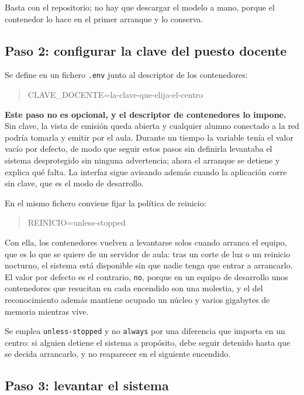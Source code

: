 Basta con el repositorio; no hay que descargar el modelo a mano, porque el contenedor lo
hace en el primer arranque y lo conserva.

\subsection*{Paso 2: configurar la clave del puesto docente}

Se define en un fichero \texttt{.env} junto al descriptor de los contenedores:

\begin{quote}\ttfamily
CLAVE\_DOCENTE=la-clave-que-elija-el-centro
\end{quote}

\textbf{Este paso no es opcional, y el descriptor de contenedores lo impone.} Sin clave, la
vista de emisión queda abierta y cualquier alumno conectado a la red podría tomarla y
emitir por el aula. Durante un tiempo la variable tenía el valor vacío por defecto, de modo
que seguir estos pasos sin definirla levantaba el sistema desprotegido sin ninguna
advertencia; ahora el arranque se detiene y explica qué falta. La interfaz sigue avisando
además cuando la aplicación corre sin clave, que es el modo de desarrollo.

En el mismo fichero conviene fijar la política de reinicio:

\begin{quote}\ttfamily
REINICIO=unless-stopped
\end{quote}

Con ella, los contenedores vuelven a levantarse solos cuando arranca el equipo, que es lo
que se quiere de un servidor de aula: tras un corte de luz o un reinicio nocturno, el
sistema está disponible sin que nadie tenga que entrar a arrancarlo. El valor por defecto es
el contrario, \texttt{no}, porque en un equipo de desarrollo unos contenedores que resucitan
en cada encendido son una molestia, y el del reconocimiento además mantiene ocupado un
núcleo y varios gigabytes de memoria mientras vive.

Se emplea \texttt{unless-stopped} y no \texttt{always} por una diferencia que importa en un
centro: si alguien detiene el sistema a propósito, debe seguir detenido hasta que se decida
arrancarlo, y no reaparecer en el siguiente encendido.

\subsection*{Paso 3: levantar el sistema}

